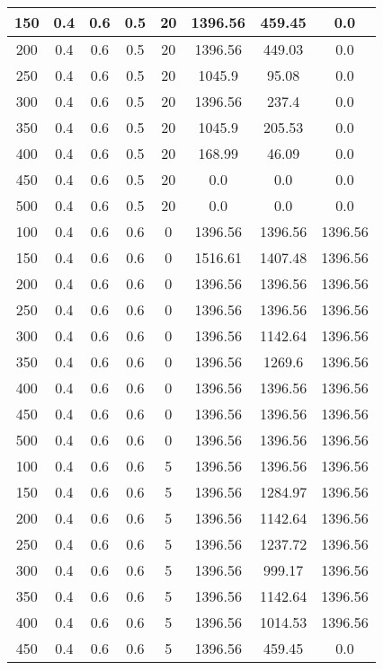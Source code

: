 \documentclass[a4paper, 12pt]{extreport}
\begin{document}
\begin{itemize}
\begin{longtable}{|c|c|c|c|c|c|c|c|}
			150 & 0.4 & 0.6 & 0.5 & 20 & 1396.56 & 459.45 & 0.0 \\\hline
			200 & 0.4 & 0.6 & 0.5 & 20 & 1396.56 & 449.03 & 0.0 \\\hline
			250 & 0.4 & 0.6 & 0.5 & 20 & 1045.9 & 95.08 & 0.0 \\\hline
			300 & 0.4 & 0.6 & 0.5 & 20 & 1396.56 & 237.4 & 0.0 \\\hline
			350 & 0.4 & 0.6 & 0.5 & 20 & 1045.9 & 205.53 & 0.0 \\\hline
			400 & 0.4 & 0.6 & 0.5 & 20 & 168.99 & 46.09 & 0.0 \\\hline
			450 & 0.4 & 0.6 & 0.5 & 20 & 0.0 & 0.0 & 0.0 \\\hline
			500 & 0.4 & 0.6 & 0.5 & 20 & 0.0 & 0.0 & 0.0 \\\hline
			100 & 0.4 & 0.6 & 0.6 & 0 & 1396.56 & 1396.56 & 1396.56 \\\hline
			150 & 0.4 & 0.6 & 0.6 & 0 & 1516.61 & 1407.48 & 1396.56 \\\hline
			200 & 0.4 & 0.6 & 0.6 & 0 & 1396.56 & 1396.56 & 1396.56 \\\hline
			250 & 0.4 & 0.6 & 0.6 & 0 & 1396.56 & 1396.56 & 1396.56 \\\hline
			300 & 0.4 & 0.6 & 0.6 & 0 & 1396.56 & 1142.64 & 1396.56 \\\hline
			350 & 0.4 & 0.6 & 0.6 & 0 & 1396.56 & 1269.6 & 1396.56 \\\hline
			400 & 0.4 & 0.6 & 0.6 & 0 & 1396.56 & 1396.56 & 1396.56 \\\hline
			450 & 0.4 & 0.6 & 0.6 & 0 & 1396.56 & 1396.56 & 1396.56 \\\hline
			500 & 0.4 & 0.6 & 0.6 & 0 & 1396.56 & 1396.56 & 1396.56 \\\hline
			100 & 0.4 & 0.6 & 0.6 & 5 & 1396.56 & 1396.56 & 1396.56 \\\hline
			150 & 0.4 & 0.6 & 0.6 & 5 & 1396.56 & 1284.97 & 1396.56 \\\hline
			200 & 0.4 & 0.6 & 0.6 & 5 & 1396.56 & 1142.64 & 1396.56 \\\hline
			250 & 0.4 & 0.6 & 0.6 & 5 & 1396.56 & 1237.72 & 1396.56 \\\hline
			300 & 0.4 & 0.6 & 0.6 & 5 & 1396.56 & 999.17 & 1396.56 \\\hline
			350 & 0.4 & 0.6 & 0.6 & 5 & 1396.56 & 1142.64 & 1396.56 \\\hline
			400 & 0.4 & 0.6 & 0.6 & 5 & 1396.56 & 1014.53 & 1396.56 \\\hline
			450 & 0.4 & 0.6 & 0.6 & 5 & 1396.56 & 459.45 & 0.0 \\\hline

\end{longtable}
\end{itemize}
\end{document}
